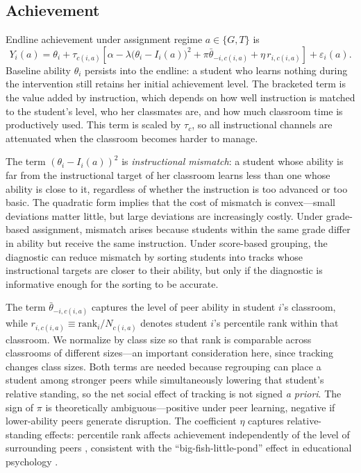 \documentclass[11pt]{article}
\begin{document}
\subsection{Achievement}

Endline achievement under assignment regime $a \in \{G, T\}$ is
\begin{equation}
\label{eq:learning}
Y_i(a) = \theta_i + \tau_{c(i,a)} \left[\alpha - \lambda\big(\theta_i - I_i(a)\big)^2 + \pi\bar{\theta}_{-i,c(i,a)} + \eta\, r_{i,c(i,a)}\right] + \varepsilon_i(a).
\end{equation}
Baseline ability $\theta_i$ persists into the endline: a student who learns nothing during the intervention still retains her initial achievement level. The bracketed term is the value added by instruction, which depends on how well instruction is matched to the student's level, who her classmates are, and how much classroom time is productively used. This term is scaled by $\tau_c$, so all instructional channels are attenuated when the classroom becomes harder to manage.

The term $(\theta_i - I_i(a))^2$ is \emph{instructional mismatch}: a student whose ability is far from the instructional target of her classroom learns less than one whose ability is close to it, regardless of whether the instruction is too advanced or too basic. The quadratic form implies that the cost of mismatch is convex---small deviations matter little, but large deviations are increasingly costly. Under grade-based assignment, mismatch arises because students within the same grade differ in ability but receive the same instruction. Under score-based grouping, the diagnostic can reduce mismatch by sorting students into tracks whose instructional targets are closer to their ability, but only if the diagnostic is informative enough for the sorting to be accurate.

The term $\bar{\theta}_{-i,c(i,a)}$ captures the level of peer ability in student $i$'s classroom, while $r_{i,c(i,a)} \equiv \text{rank}_i / N_{c(i,a)}$ denotes student $i$'s percentile rank within that classroom. We normalize by class size so that rank is comparable across classrooms of different sizes---an important consideration here, since tracking changes class sizes. Both terms are needed because regrouping can place a student among stronger peers while simultaneously lowering that student's relative standing, so the net social effect of tracking is not signed \emph{a priori}. The sign of $\pi$ is theoretically ambiguous---positive under peer learning, negative if lower-ability peers generate disruption. The coefficient $\eta$ captures relative-standing effects: percentile rank affects achievement independently of the level of surrounding peers \citep{murphy2020top, elsner2021rank}, consistent with the ``big-fish-little-pond'' effect in educational psychology \citep{hoxby2005taking}.
\end{document}
